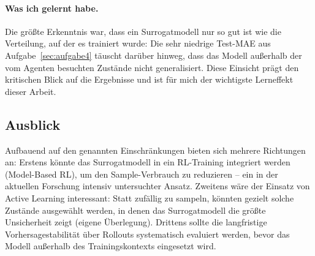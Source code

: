 \paragraph{Was ich gelernt habe.}
Die größte Erkenntnis war, dass ein Surrogatmodell nur so gut ist wie die Verteilung, auf der es trainiert wurde: Die sehr niedrige Test-MAE aus Aufgabe~\ref{sec:aufgabe4} täuscht darüber hinweg, dass das Modell außerhalb der vom Agenten besuchten Zustände nicht generalisiert. Diese Einsicht prägt den kritischen Blick auf die Ergebnisse und ist für mich der wichtigste Lerneffekt dieser Arbeit.

\subsection{Ausblick}
\label{sec:ausblick}

Aufbauend auf den genannten Einschränkungen bieten sich mehrere Richtungen an: Erstens könnte das Surrogatmodell in ein \ac{RL}-Training integriert werden (Model-Based \ac{RL}), um den Sample-Verbrauch zu reduzieren -- ein in der aktuellen Forschung intensiv untersuchter Ansatz. Zweitens wäre der Einsatz von Active Learning interessant: Statt zufällig zu sampeln, könnten gezielt solche Zustände ausgewählt werden, in denen das Surrogatmodell die größte Unsicherheit zeigt (eigene Überlegung). Drittens sollte die langfristige Vorhersagestabilität über Rollouts systematisch evaluiert werden, bevor das Modell außerhalb des Trainingskontexts eingesetzt wird.

